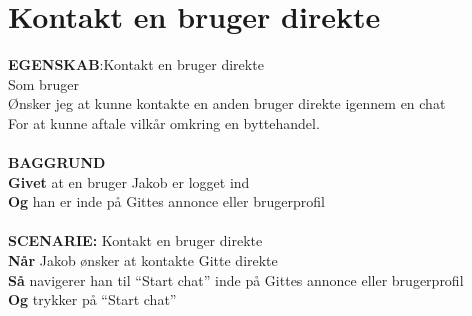 \section{Kontakt en bruger direkte}
{\color{blue}\textbf{EGENSKAB}:}Kontakt en bruger direkte \\
Som bruger \\
Ønsker jeg at kunne kontakte en anden bruger direkte igennem en chat \\
For at kunne aftale vilkår omkring en byttehandel.\\ \\
{\color{blue}\textbf{BAGGRUND}} \\
{\color{blue}\textbf{Givet}} at en bruger Jakob er logget ind \\
{\color{blue}\textbf{Og}} han er inde på Gittes annonce eller brugerprofil\\\\
{\color{blue}\textbf{SCENARIE:}} Kontakt en bruger direkte\\
{\color{blue}\textbf{Når}} Jakob ønsker at kontakte Gitte direkte\\
{\color{blue}\textbf{Så}} navigerer han til “Start chat” inde på Gittes annonce eller brugerprofil \\
{\color{blue}\textbf{Og}} trykker på “Start chat”